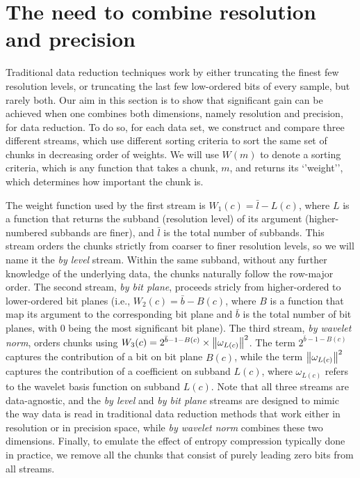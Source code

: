 \section{The need to combine resolution and precision}
\label{sec:motivation}

Traditional data reduction techniques work by either truncating the finest few resolution levels, or
truncating the last few low-ordered bits of every sample, but rarely both. Our aim in this section
is to show that significant gain can be achieved when one combines both dimensions, namely
resolution and precision, for data reduction. To do so, for each data set, we construct and compare
three different streams, which use different sorting criteria to sort the same set of chunks in
decreasing order of weights. We will use $W(m)$ to denote a sorting criteria, which is any function
that takes a chunk, $m$, and returns its `'weight'', which determines how important the chunk is.

The weight function used by the first stream is $W_1(c)=\bar{l}-L(c)$, where $L$ is a function that
returns the subband (resolution level) of its argument (higher-numbered subbands are finer), and
$\bar{l}$ is the total number of subbands. This stream orders the chunks strictly from coarser to
finer resolution levels, so we will name it the \emph{by level} stream. Within the same subband,
without any further knowledge of the underlying data, the chunks naturally follow the row-major
order. The second stream, \emph{by bit plane}, proceeds stricly from higher-ordered to lower-ordered
bit planes (i.e., $W_2(c)=\bar{b}-B(c)$, where $B$ is a function that map its argument to the
corresponding bit plane and $\bar{b}$ is the total number of bit planes, with $0$ being the most
significant bit plane). The third stream, \emph{by wavelet norm}, orders chunks using
$W_3(c)=2^{\bar{b}-1-B(c)}\times \left\lVert\omega_{L(c)}\right\rVert^2$. The term $2^{\bar{b}-1-B(c)}$ captures the
contribution of a bit on bit plane $B(c)$, while the term $\left\lVert\omega_{L(c)}\right\rVert^2$ captures the
contribution of a coefficient on subband $L(c)$, where $\omega_{L(c)}$ refers to the wavelet basis
function on subband $L(c)$. Note that all three streams are data-agnostic, and the \emph{by level}
and \emph{by bit plane} streams are designed to mimic the way data is read in traditional data
reduction methods that work either in resolution or in precision space, while \emph{by wavelet norm}
combines these two dimensions. Finally, to emulate the effect of entropy compression typically done
in practice, we remove all the chunks that consist of purely leading zero bits from all streams.

